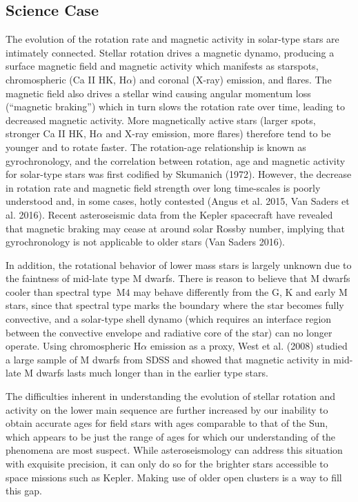 \subsection{Science Case }

The evolution of the rotation rate and magnetic activity in solar-type
stars are intimately connected. Stellar rotation drives a magnetic
dynamo, producing a surface magnetic field and magnetic activity which
manifests as starspots, chromospheric (Ca II HK, H$\alpha$) and coronal
(X-ray) emission, and flares. The magnetic field also drives a stellar
wind causing angular momentum loss (\textquotedblleft{}magnetic braking'')
which in turn slows the rotation rate over time, leading to decreased
magnetic activity. More magnetically active stars (larger spots, stronger
Ca II HK, H$\alpha$ and X-ray emission, more flares) therefore tend
to be younger and to rotate faster. The rotation-age relationship
is known as gyrochronology, and the correlation between rotation,
age and magnetic activity for solar-type stars was first codified
by Skumanich (1972). However, the decrease in rotation rate and magnetic
field strength over long time-scales is poorly understood and, in
some cases, hotly contested (Angus et al. 2015, Van Saders et al.
2016). Recent asteroseismic data from the Kepler spacecraft have revealed
that magnetic braking may cease at around solar Rossby number, implying
that gyrochronology is not applicable to older stars (Van Saders 2016).

In addition, the rotational behavior of lower mass stars is largely
unknown due to the faintness of mid-late type M dwarfs. There is reason
to believe that M dwarfs cooler than spectral type $~\mathrm{M}4$
may behave differently from the G, K and early M stars, since that
spectral type marks the boundary where the star becomes fully convective,
and a solar-type shell dynamo (which requires an interface region
between the convective envelope and radiative core of the star) can
no longer operate. Using chromospheric H$\alpha$ emission as a proxy,
West et al. (2008) studied a large sample of M dwarfs from SDSS and
showed that magnetic activity in mid-late M dwarfs lasts much longer
than in the earlier type stars.

The difficulties inherent in understanding the evolution of stellar
rotation and activity on the lower main sequence are further increased
by our inability to obtain accurate ages for field stars with ages
comparable to that of the Sun, which appears to be just the range
of ages for which our understanding of the phenomena are most suspect.
While asteroseismology can address this situation with exquisite precision,
it can only do so for the brighter stars accessible to space missions
such as Kepler. Making use of older open clusters is a way to fill
this gap.

